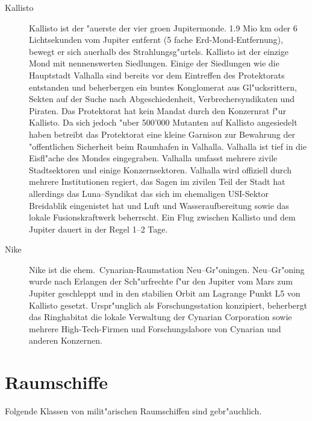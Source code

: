 \begin{appendices}
\begin{description}
\item [Kallisto] Kallisto ist der "au\3erste der vier gro\3en Jupitermonde. 1.9 Mio km oder 6 Lichtsekunden vom Jupiter
      entfernt (5 fache Erd-Mond-Entfernung), bewegt er sich au\3erhalb des Strahlungsg"urtels. Kallisto ist der einzige Mond mit nennenswerten Siedlungen. Einige der Siedlungen wie die Hauptstadt Valhalla sind bereits vor dem Eintreffen des Protektorats entstanden und beherbergen ein buntes Konglomerat aus Gl"ucksrittern, Sekten auf der Suche nach Abgeschiedenheit, Verbrechersyndikaten und Piraten. Das Protektorat hat kein Mandat durch den Konzernrat f"ur Kallisto. Da sich jedoch "uber 500'000 Mutanten auf Kallisto angesiedelt haben betreibt das Protektorat eine kleine Garnison zur Bewahrung der "offentlichen Sicherheit beim Raumhafen in Valhalla. Valhalla ist tief in die Eisfl"ache des Mondes eingegraben. Valhalla umfasst mehrere zivile Stadtsektoren und einige Konzernsektoren. Valhalla wird offiziell durch mehrere Institutionen regiert, das Sagen im zivilen Teil der Stadt hat allerdings das Luna--Syndikat das sich im ehemaligen USI-Sektor Breidablik eingenistet hat und Luft und Wasseraufbereitung sowie das lokale Fusionskraftwerk beherrscht. Ein Flug zwischen Kallisto und dem Jupiter dauert in der Regel 1--2 Tage. %
\item [Nike] Nike ist die ehem.~Cynarian-Raumstation Neu--Gr"oningen. Neu--Gr"oning wurde nach Erlangen der
      Sch"urfrechte f"ur den Jupiter vom Mars zum Jupiter geschleppt und in den stabilien Orbit am Lagrange Punkt L5 von Kallisto gesetzt. Urspr"unglich als Forschungsstation konzipiert, beherbergt das Ringhabitat die lokale Verwaltung der Cynarian Corporation sowie mehrere High-Tech-Firmen und Forschungslabore von Cynarian und anderen Konzernen.
\end{description}

\section{Raumschiffe}

Folgende Klassen von milit"arischen Raumschiffen sind gebr"auchlich.


\end{appendices}
